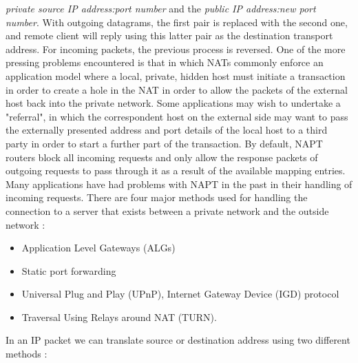 \documentclass[11pt]{article}
\begin{document}
\textit{private source IP address:port number} and the \textit{public IP address:new port number}. With outgoing datagrams, the first pair is replaced with the second one, and remote client will reply using this latter pair as the destination transport address. For incoming packets, the previous process is reversed. One of the more pressing problems encountered is that in which NATs commonly enforce an application model where a local, private, hidden host must initiate a transaction in order to create a hole in the NAT in order to allow the packets of the external host back into the private network. Some applications may wish to undertake a "referral", in which the correspondent host on the external side may want to pass the externally presented address and port details of the local host to a third party in order to start a further part of the transaction. By default, NAPT routers block all incoming requests and only allow the response packets of outgoing requests to pass through it as a result of the available mapping entries. Many applications have had problems with NAPT in the past in their handling of incoming requests. There are four major methods used for handling the connection to a server that exists between a private network and the outside network :
\begin{itemize}
\item Application Level Gateways (ALGs)
\item Static port forwarding
\item Universal Plug and Play (UPnP), Internet Gateway Device (IGD) protocol
\item Traversal Using Relays around NAT (TURN).
\end{itemize}
In an IP packet we can translate source or destination address using two different methods :
\end{document}
